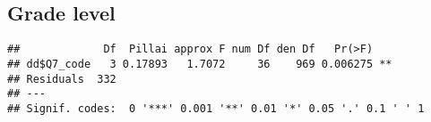 \documentclass[]{article}
\newenvironment{Shaded}{\begin{snugshade}}{\end{snugshade}}
\newcommand{\KeywordTok}[1]{\textcolor[rgb]{0.13,0.29,0.53}{\textbf{#1}}}
\newcommand{\DataTypeTok}[1]{\textcolor[rgb]{0.13,0.29,0.53}{#1}}
\newcommand{\DecValTok}[1]{\textcolor[rgb]{0.00,0.00,0.81}{#1}}
\newcommand{\StringTok}[1]{\textcolor[rgb]{0.31,0.60,0.02}{#1}}
\newcommand{\OperatorTok}[1]{\textcolor[rgb]{0.81,0.36,0.00}{\textbf{#1}}}
\newcommand{\NormalTok}[1]{#1}
\begin{document}
\subsection{Grade level}\label{grade-level}

\begin{Shaded}
\end{Shaded}

\begin{verbatim}
##             Df  Pillai approx F num Df den Df   Pr(>F)   
## dd$Q7_code   3 0.17893   1.7072     36    969 0.006275 **
## Residuals  332                                           
## ---
## Signif. codes:  0 '***' 0.001 '**' 0.01 '*' 0.05 '.' 0.1 ' ' 1
\end{verbatim}
\end{document}
